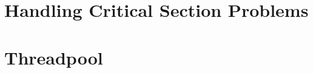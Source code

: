 \documentclass[titlepage]{article}
\begin{document}


\clearpage

\section{Handling Critical Section Problems}



\clearpage

\section{Threadpool}



\clearpage

 


\clearpage
\end{document}
